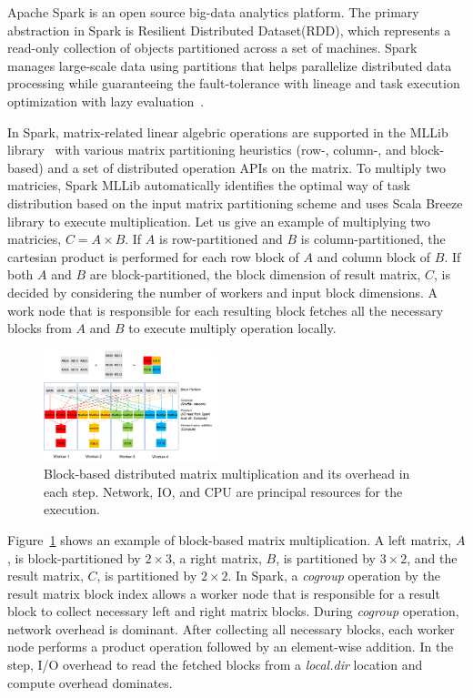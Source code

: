 \documentclass[10pt, conference, compsocconf]{IEEEtran}
\begin{document}
Apache Spark is an open source big-data analytics platform. The primary abstraction in Spark is Resilient Distributed Dataset(RDD), which represents a read-only collection of objects partitioned across a set of machines. Spark manages large-scale data using partitions that helps parallelize distributed data processing while guaranteeing the fault-tolerance with lineage and task execution optimization with lazy evaluation~\cite{spark}.

In Spark, matrix-related linear algebric operations are supported in the MLLib library~\cite{spark-mm} with various matrix partitioning heuristics (row-, column-, and block-based) and a set of distributed operation APIs on the matrix. To multiply two matricies, Spark MLLib automatically identifies the optimal way of task distribution based on the input matrix partitioning scheme and uses Scala Breeze library to execute multiplication. Let us give an example of multiplying two matricies, $C = A \times B$. If $A$ is row-partitioned and $B$ is column-partitioned, the cartesian product is performed for each row block of $A$ and column block of $B$. If both $A$ and $B$ are block-partitioned, the block dimension of result matrix, $C$, is decided by considering the number of workers and input block dimensions. A work node that is responsible for each resulting block fetches all the necessary blocks from $A$ and $B$ to execute multiply operation locally.

\begin{figure}
  \centering\includegraphics[width=0.45\textwidth]{figures/matmult-overhead-non-square.pdf}\caption{Block-based distributed matrix multiplication and its overhead in each step. Network, IO, and CPU are principal resources for the execution.}\label{fig:matmul-with-overhead}
\end{figure}
Figure~\ref{fig:matmul-with-overhead} shows an example of block-based matrix multiplication. A left matrix, $A$, is block-partitioned by $2 \times 3$, a right matrix, $B$, is partitioned by $3 \times 2$, and the result matrix, $C$, is partitioned by $2 \times 2$. In Spark, a \textit{cogroup} operation by the result matrix block index allows a worker node that is responsible for a result block to collect necessary left and right matrix blocks. During \textit{cogroup} operation, network overhead is dominant. After collecting all necessary blocks, each worker node performs a product operation followed by an element-wise addition. In the step, I/O overhead to read the fetched blocks from a \textit{local.dir} location and compute overhead dominates.
\end{document}
